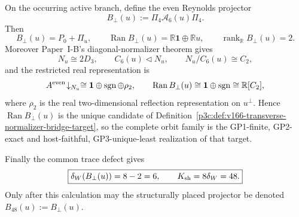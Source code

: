 \documentclass[12pt,a4paper]{article}
\begin{document}
\begin{theorem}
\label{p3c:thm:v166-unique-transverse-k48-bridge}
On the occurring active branch, define the even Reynolds projector
\begin{equation}
 \label{p3c:eq:v166-transverse-reynolds-projector}
 B_\perp(u):=\Pi_4\mathcal A_6(u)\Pi_4.
\end{equation}
Then
\begin{equation}
 \label{p3c:eq:v166-transverse-bridge-range}
 \boxed{
 B_\perp(u)=P_0+\Pi_u,
 \qquad
 \operatorname{Ran}B_\perp(u)
 =\mathbb R\mathbf1\oplus\mathbb Ru,
 \qquad
 \operatorname{rank}_{\mathbb R}B_\perp(u)=2.}
\end{equation}
Moreover Paper~I-B's diagonal-normalizer theorem gives
\begin{equation}
 \label{p3c:eq:v166-binary-dihedral-quotient}
 N_u\cong2D_3,
 \qquad C_6(u)\triangleleft N_u,
 \qquad N_u/C_6(u)\cong C_2,
\end{equation}
and the restricted real representation is
\begin{equation}
 \label{p3c:eq:v166-even-normalizer-decomposition}
 A^{\rm even}\!\downarrow_{N_u}
 \cong
 \mathbf1\oplus\operatorname{sgn}\oplus\rho_2,
 \qquad
 \operatorname{Ran}B_\perp(u)
 \cong\mathbf1\oplus\operatorname{sgn}
 \cong\mathbb R[C_2],
\end{equation}
where \(\rho_2\) is the real two-dimensional reflection representation on
\(u^\perp\).  Hence \(\operatorname{Ran}B_\perp(u)\) is the unique candidate
of Definition~\ref{p3c:def:v166-transverse-normalizer-bridge-target}, so the
complete orbit family is the GP1-finite, GP2-exact and host-faithful,
GP3-unique-least realization of that target.

Finally the common trace defect gives
\begin{equation}
 \label{p3c:eq:v166-transverse-bridge-depth}
 \boxed{
 \delta_W(B_\perp(u))=8-2=6,
 \qquad K_{\rm sh}=8\delta_W=48.}
\end{equation}
Only after this calculation may the structurally placed projector be denoted
\(B_{48}(u):=B_\perp(u)\).
\end{theorem}
\end{document}
